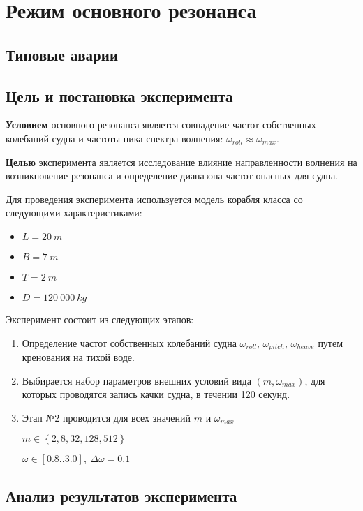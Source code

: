 \section{Режим основного резонанса}

\subsection{Типовые аварии}


\subsection{Цель и постановка эксперимента}

\textbf{Условием} основного резонанса является совпадение частот собственных колебаний судна и частоты пика спектра волнения: $\omega_{roll} \approx \omega_{max}$.

\textbf{Целью} эксперимента является исследование влияние направленности волнения на возникновение резонанса и определение диапазона частот опасных для судна.

Для проведения эксперимента используется модель корабля класса  со следующими характеристиками:
\begin{itemize}
	\item	$L = 20\ m$
	\item	$B = 7\ m$
	\item	$T = 2\ m$
	\item	$D = 120\ 000\ kg$
\end{itemize}

Эксперимент состоит из следующих этапов:
\begin{enumerate}
	\item	Определение частот собственных колебаний судна 
			$\omega_{roll}$, $\omega_{pitch}$, $\omega_{heave}$ путем кренования на тихой воде.
	\item	Выбирается набор параметров внешних условий вида $(m, \omega_{max})$, для которых
			проводятся запись качки судна, в течении 120 секунд.
	\item	Этап №2	проводится для всех значений $m$ и $\omega_{max}$
	
			$m \in \left\lbrace 2,8,32,128,512 \right\rbrace$
			
			$\omega \in [0.8..3.0],\ \Delta\omega=0.1$ 

\end{enumerate}

\subsection{Анализ результатов эксперимента}

